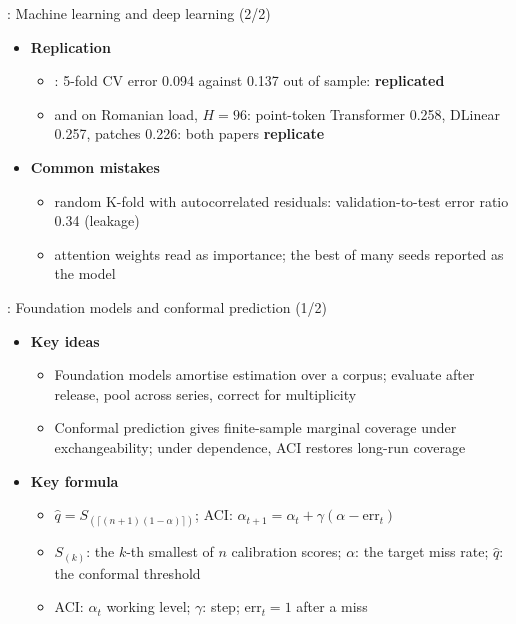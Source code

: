 \begin{frame}{: Machine learning and deep learning (2/2)}
\itemsize{\small}
\begin{itemize}
    \item \textbf{Replication}
    \begin{itemize}
        \item {}: 5-fold CV error 0.094 against 0.137 out of sample: \textbf{replicated}
        \item {} and  on Romanian load, $H = 96$: point-token Transformer 0.258, DLinear 0.257, patches 0.226: both papers \textbf{replicate}
    \end{itemize}
    \item \textbf{Common mistakes}
    \begin{itemize}
        \item random K-fold with autocorrelated residuals: validation-to-test error ratio 0.34 (leakage)
        \item attention weights read as importance; the best of many seeds reported as the model
    \end{itemize}
\end{itemize}
\end{frame}

\begin{frame}{: Foundation models and conformal prediction (1/2)}
\itemsize{\footnotesize}
\begin{itemize}
    \item \textbf{Key ideas}
    \begin{itemize}
        \item Foundation models amortise estimation over a corpus; evaluate after release, pool across series, correct for multiplicity
        \item Conformal prediction gives finite-sample marginal coverage under exchangeability; under dependence, ACI restores long-run coverage
    \end{itemize}
    \item \textbf{Key formula}
    \begin{itemize}
        \item $\hat q = S_{(\lceil(n + 1)(1 - \alpha)\rceil)}$; ACI: $\alpha_{t+1} = \alpha_t + \gamma(\alpha - \mathrm{err}_t)$
        \item $S_{(k)}$: the $k$-th smallest of $n$ calibration scores; $\alpha$: the target miss rate; $\hat q$: the conformal threshold
        \item ACI: $\alpha_t$ working level; $\gamma$: step; $\mathrm{err}_t = 1$ after a miss
    \end{itemize}
\end{itemize}
\end{frame}

